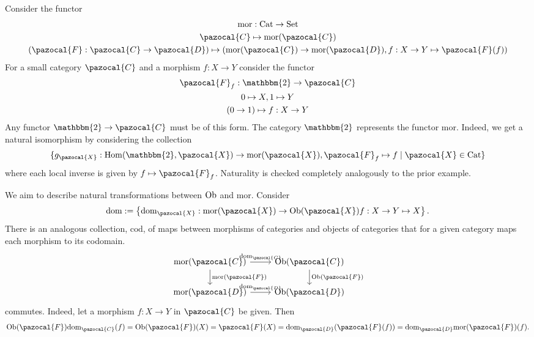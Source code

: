 \begin{example}
    Consider the functor
    \begin{gather*}
        \mathrm{mor}: \mathrm{Cat} \rightarrow \mathrm{Set}\\
        \pazocal{C} \mapsto \mathrm{mor}(\pazocal{C})\\
        (\pazocal{F} : \pazocal{C}\rightarrow \pazocal{D}) \mapsto (\mathrm{mor}(\pazocal{C})\rightarrow \mathrm{mor}(\pazocal{D}), f:X\rightarrow Y\mapsto \pazocal{F}(f))
    \end{gather*}  
    For a small category $\pazocal{C}$ and a morphism $f: X\rightarrow Y$ consider the functor 
    \begin{gather*}
        \pazocal{F}_f : \mathbbm{2} \rightarrow \pazocal{C}\\
        0 \mapsto X, 1\mapsto Y\\
        (0\rightarrow 1) \mapsto f : X\rightarrow Y
    \end{gather*}
    Any functor $\mathbbm{2}\rightarrow \pazocal{C}$ must be of this form. The category $\mathbbm{2}$ represents the functor $\mathrm{mor}$. Indeed, we get a natural isomorphism by considering the collection 
    $$
        \{g_\pazocal{X}: \Hom(\mathbbm{2},\pazocal{X}) \rightarrow \mathrm{mor}(\pazocal{X}), \pazocal{F}_f \mapsto f \mid \pazocal{X}\in \mathrm{Cat}\}
    $$
    where each local inverse is given by $f\mapsto \pazocal{F}_f$. Naturality is checked completely analogously to the prior example. 
\end{example}
\begin{example}
    We aim to describe natural transformations between $\mathrm{Ob}$ and $\mathrm{mor}$. Consider
    $$
        \dom:= \left\{ \dom_\pazocal{X} : \mathrm{mor}(\pazocal{X}) \rightarrow \Ob(\pazocal{X})\\
        f : X\rightarrow Y \mapsto X\right\}.
    $$
    There is an analogous collection, $\mathrm{cod}$, of maps between morphisms of categories and objects of categories that for a given category maps each morphism to its codomain. 
    $$
        \begin{tikzcd}
            \mathrm{mor}(\pazocal{C}) \arrow[r,"\dom_\pazocal{C}"] \arrow[d, "\mathrm{mor}(\pazocal{F})"] & \Ob(\pazocal{C}) \arrow[d,"\Ob(\pazocal{F})"]\\
            \mathrm{mor}(\pazocal{D}) \arrow[r,"\dom_\pazocal{D}"] & \Ob(\pazocal{D}) 
        \end{tikzcd}
    $$
    commutes. Indeed, let a morphism $f: X\rightarrow Y$ in $\pazocal{C}$ be given. Then 
    \begin{align*}
        \Ob(\pazocal{F})\dom_\pazocal{C}(f) = \Ob(\pazocal{F})(X) = \pazocal{F}(X) = \dom_\pazocal{D}(\pazocal{F}(f))= \dom_\pazocal{D}\mathrm{mor}(\pazocal{F})(f).
    \end{align*}
\end{example}
